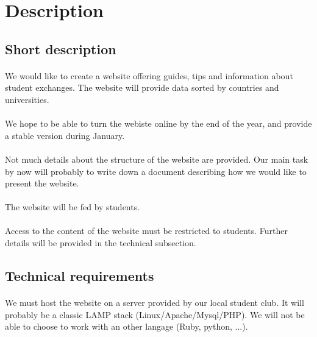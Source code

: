 \section{Description}

\subsection{Short description}
\paragraph{} We would like to create a website offering guides, tips and
information about student exchanges. The website will provide data sorted by
countries and universities.

\paragraph{} We hope to be able to turn the webiste online by the end of the
year, and provide a stable version during January.

\paragraph{} Not much details about the structure of the website are provided.
Our main task by now will probably to write down a document describing how we
would like to present the website.

\paragraph{} The website will be fed by students.

\paragraph{} Access to the content of the website must be restricted to
students. Further details will be provided in the technical subsection.

\subsection{Technical requirements}

\paragraph{} We must host the website on a server provided by our local student
club. It will probably be a classic LAMP stack (Linux/Apache/Mysql/PHP). We will
not be able to choose to work with an other langage (Ruby, python, ...).

